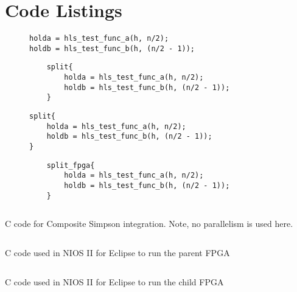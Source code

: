 \chapter{Code Listings}

\begin{figure}[!h]
    \begin{minipage}{0.45\textwidth}
    \centering
    \begin{verbatim}
holda = hls_test_func_a(h, n/2);
holdb = hls_test_func_b(h, (n/2 - 1));
    \end{verbatim}
    \end{minipage}
    \begin{minipage}{0.45\textwidth}
    \centering
    \begin{verbatim}
    split{
        holda = hls_test_func_a(h, n/2);
        holdb = hls_test_func_b(h, (n/2 - 1));
    }
    \end{verbatim}
    \end{minipage}
     \label{lst:org_to_par}
\end{figure}

\begin{figure}[!h]
    \begin{minipage}{0.47\textwidth}
    \centering
    \begin{verbatim}
split{
    holda = hls_test_func_a(h, n/2);
    holdb = hls_test_func_b(h, (n/2 - 1));
}
    \end{verbatim}
    \end{minipage}
    \begin{minipage}{0.45\textwidth}
    \centering
    \begin{verbatim}
    split_fpga{
        holda = hls_test_func_a(h, n/2);
        holdb = hls_test_func_b(h, (n/2 - 1));
    }
    \end{verbatim}
    \end{minipage}
     \label{lst:par_to_off}
\end{figure}

\begin{listing}
    \inputminted[]{c}{08_code_listings/code/integration_seq.c}
    \caption{C code for Composite Simpson integration. Note, no parallelism is used here. }
    \label{lst:c_simp_st}
\end{listing}


\begin{listing}
    \inputminted[]{c}{08_code_listings/code/host_fpga.c}
    \caption{C code used in NIOS II for Eclipse to run the parent FPGA }
    \label{lst:parent_code}
\end{listing}

\begin{listing}
    \inputminted[]{c}{08_code_listings/code/child_fpga.c}
    \caption{C code used in NIOS II for Eclipse to run the child FPGA }
    \label{lst:child_code}
\end{listing}
